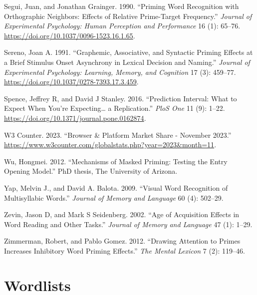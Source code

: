 \documentclass[
]{interact}
\newlength{\cslhangindent}
\newenvironment{CSLReferences}[2] %
 {\begin{list}{}{%
  \setlength{\itemindent}{0pt}
  \setlength{\leftmargin}{0pt}
  \setlength{\parsep}{0pt}
  \ifodd #1
   \setlength{\leftmargin}{\cslhangindent}
   \setlength{\itemindent}{-1\cslhangindent}
  \fi
  \setlength{\itemsep}{#2\baselineskip}}}
 {\end{list}}
\begin{document}
\begin{CSLReferences}{1}{0}
Segui, Juan, and Jonathan Grainger. 1990. {``Priming Word Recognition
with Orthographic Neighbors: Effects of Relative Prime-Target
Frequency.''} \emph{Journal of Experimental Psychology: Human Perception
and Performance} 16 (1): 65--76.
\url{https://doi.org/10.1037/0096-1523.16.1.65}.

Sereno, Joan A. 1991. {``Graphemic, Associative, and Syntactic Priming
Effects at a Brief Stimulus Onset Asynchrony in Lexical Decision and
Naming.''} \emph{Journal of Experimental Psychology: Learning, Memory,
and Cognition} 17 (3): 459--77.
\url{https://doi.org/10.1037/0278-7393.17.3.459}.

Spence, Jeffrey R, and David J Stanley. 2016. {``Prediction Interval:
What to Expect When You're Expecting\ldots{} a Replication.''}
\emph{PloS One} 11 (9): 1--22.
\url{https://doi.org/10.1371/journal.pone.0162874}.

W3 Counter. 2023. {``Browser \& Platform Market Share - November
2023.''}
\url{https://www.w3counter.com/globalstats.php?year=2023&month=11}.

Wu, Hongmei. 2012. {``Mechanisms of Masked Priming: Testing the Entry
Opening Model.''} PhD thesis, The University of Arizona.

Yap, Melvin J., and David A. Balota. 2009. {``Visual Word Recognition of
Multisyllabic Words.''} \emph{Journal of Memory and Language} 60 (4):
502--29.

Zevin, Jason D, and Mark S Seidenberg. 2002. {``Age of Acquisition
Effects in Word Reading and Other Tasks.''} \emph{Journal of Memory and
Language} 47 (1): 1--29.

Zimmerman, Robert, and Pablo Gomez. 2012. {``Drawing Attention to Primes
Increases Inhibitory Word Priming Effects.''} \emph{The Mental Lexicon}
7 (2): 119--46.

\end{CSLReferences}

\newpage{}

\section*{Wordlists}\label{wordlists}
\end{document}
